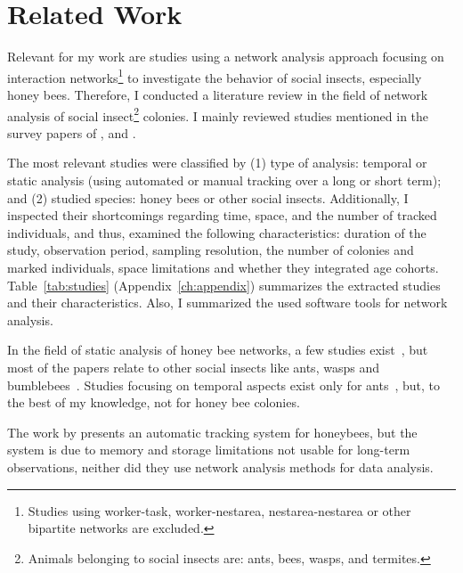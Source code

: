 \chapter{Related Work}
\label{ch:relatedwork}

Relevant for my work are studies using a network analysis approach focusing on interaction networks\footnote{Studies using worker-task, worker-nestarea, nestarea-nestarea or other bipartite networks are excluded.} to investigate the behavior of social insects, especially honey bees.
Therefore, I conducted a literature review in the field of network analysis of social insect\footnote{Animals belonging to social insects are: ants, bees, wasps, and termites.} colonies.
I mainly reviewed studies mentioned in the survey papers of \textcite{Pinter-Wollman2014}, \textcite[chapter~15]{krause2014animal} and \textcite{charbonneau2013social}.


The most relevant studies were classified by (1) type of analysis: temporal or static analysis (using automated or manual tracking over a long or short term); and (2) studied species: honey bees or other social insects.
Additionally, I inspected their shortcomings regarding time, space, and the number of tracked individuals, and thus, examined the following characteristics: duration of the study, observation period, sampling resolution, the number of colonies and marked individuals, space limitations and whether they integrated age cohorts.
Table~\ref{tab:studies} (Appendix~\ref{ch:appendix}) summarizes the extracted studies and their characteristics. Also, I summarized the used software tools for network analysis.


In the field of static analysis of honey bee networks, a few studies exist~\cite{baracchi2014socio,naug2008structure,scholl2011olfactory,naug2007experimentally}, but most of the papers relate to other social insects like ants, wasps and bumblebees~\cite{greenwald2015ant,pinter2011effect,otterstatter2007contact,quevillon2015social,naug2009structure,formica2012fitness,waters2012information,sendova2010emergency}.
Studies focusing on temporal aspects exist only for ants~\cite{mersch2013tracking,blonder2011time,jeanson2012long}, but, to the best of my knowledge, not for honey bee colonies.


The work by \textcite{kimura2011new} presents an automatic tracking system for honeybees, but the system is due to memory and storage limitations not usable for long-term observations, neither did they use network analysis methods for data analysis.

